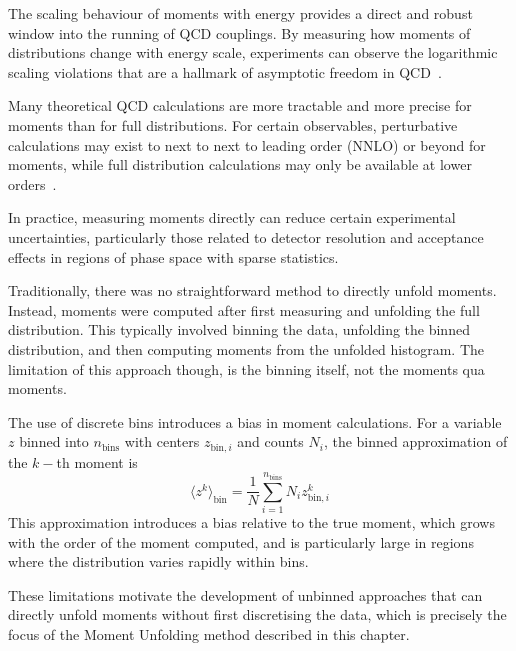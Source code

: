         The scaling behaviour of moments with energy provides a direct and robust window into the running of QCD couplings.
        By measuring how moments of distributions change with energy scale, experiments can observe the logarithmic scaling violations that are a hallmark of asymptotic freedom in QCD~\cite{Gross:1973id, Deur2016TheCoupling, Abe1990DeterminationApproximation, Farhi1977QuantumJets}.

        Many theoretical QCD calculations are more tractable and more precise for moments than for full distributions.
        For certain observables, perturbative calculations may exist to next to next to leading order (NNLO) or beyond for moments, while full distribution calculations may only be available at lower orders~\cite{Catani:1992ua, gehrmannResummationJetRates2017, Ridder2009NNLOAnnihilation, Chandramohan1981ConsequencesAnnihilation, Catani1991ThrustAnnihilation, Catani1991HeavyAnnihilation}.
        
        In practice, measuring moments directly can reduce certain experimental uncertainties, particularly those related to detector resolution and acceptance effects in regions of phase space with sparse statistics.

        Traditionally, there was no straightforward method to directly unfold moments.
        Instead, moments were computed after first measuring and unfolding the full distribution.
        This typically involved binning the data, unfolding the binned distribution, and then computing moments from the unfolded histogram.
        The limitation of this approach though, is the binning itself, not the moments qua moments.
        
        The use of discrete bins introduces a bias in moment calculations.
        For a variable $z$ binned into $n_{\text{bins}}$ with centers $z_{\text{bin},i}$ and counts $N_i$, the binned approximation of the $k-$th moment is
        \[
            \langle z^k \rangle_{\text{bin}} = \frac{1}{N} \sum_{i=1}^{n_{\text{bins}}} N_i z_{\text{bin},i}^k
        \]
        This approximation introduces a bias relative to the true moment, which grows with the order of the moment computed, and is particularly large in regions where the distribution varies rapidly within bins.

        These limitations motivate the development of unbinned approaches that can directly unfold moments without first discretising the data, which is precisely the focus of the Moment Unfolding method described in this chapter.
